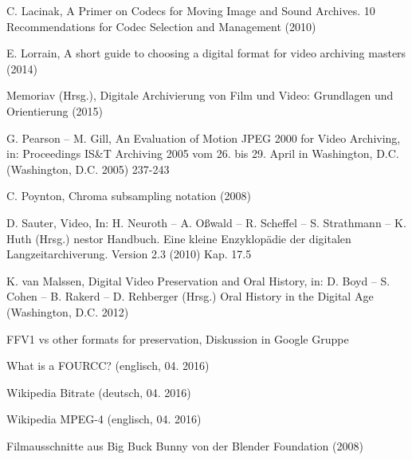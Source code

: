 \begin{flushleft}
C. Lacinak, A Primer on Codecs for Moving Image and Sound Archives. 10 Recommendations for Codec Selection and Management (2010) 

E. Lorrain, A short guide to choosing a digital format for video archiving masters (2014) 

Memoriav (Hrsg.), Digitale Archivierung von Film und Video: Grundlagen und Orientierung (2015) 

G. Pearson -- M. Gill, An Evaluation of Motion JPEG 2000 for Video Archiving, in: Proceedings IS\&T Archiving 2005 vom 26. bis 29. April in Washington, D.C. (Washington, D.C. 2005) 237-243 

C. Poynton, Chroma subsampling notation (2008) 

D. Sauter, Video, In: H. Neuroth -- A. Oßwald -- R. Scheffel -- S. Strathmann -- K. Huth (Hrsg.) nestor Handbuch. Eine kleine Enzyklopädie der digitalen Langzeitarchiverung. Version 2.3 (2010) Kap. 17.5 

K. van Malssen, Digital Video Preservation and Oral History, in: D. Boyd -- S. Cohen -- B. Rakerd -- D. Rehberger (Hrsg.) Oral History in the Digital Age (Washington, D.C. 2012) 

FFV1 vs other formats for preservation, Diskussion in Google Gruppe 

What is a FOURCC? (englisch, 04. 2016) 

Wikipedia Bitrate (deutsch, 04. 2016) 

Wikipedia MPEG-4 (englisch, 04. 2016) 

Filmausschnitte aus Big Buck Bunny von der Blender Foundation (2008) 


\end{flushleft}
